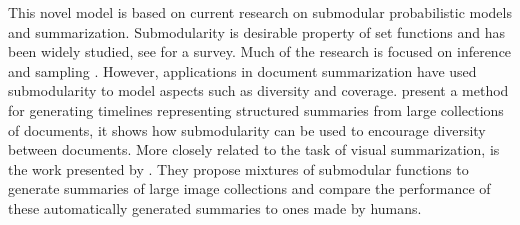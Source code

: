 This novel model is based on current research on submodular probabilistic models and summarization. Submodularity is desirable property of set functions and has been widely studied, see \cite{krause14submodular} for a survey. Much of the research is focused on inference \citep{djolonga14variational, djolonga15scalable} and sampling \citep{gotovos15sampling}. However, applications in document summarization have used submodularity to model aspects such as diversity and coverage. \citet{Shahaf2012, Shahaf2013} present a method for generating timelines representing structured summaries from large collections of documents, it shows how submodularity can be used to encourage diversity between documents. More closely related to the task of visual summarization, is the work presented by \citet{Tschiatschek2014}. They propose mixtures of submodular functions to generate summaries of large image collections and compare the performance of these automatically generated summaries to ones made by humans.
